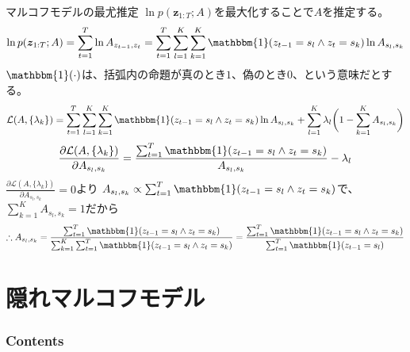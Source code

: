 \documentclass[aspectratio=169,unicode,dvipdfmx,14pt]{beamer}
\begin{document}
\begin{frame}{マルコフモデルの最尤推定}
\FontMath
$\ln p(\bm{z}_{1:T};A)$を最大化することで$A$を推定する。
\begin{align}
\ln p(\bm{z}_{1:T};A) 
= \sum_{t=1}^T \ln A_{z_{t-1}, z_t}
= \sum_{t=1}^T \sum_{l=1}^K \sum_{k=1}^K \mathbbm{1}(z_{t-1}=s_l \wedge z_t=s_k) \ln A_{s_l,s_k}
\end{align}
$\mathbbm{1}(\cdot)$は、括弧内の命題が真のとき$1$、偽のとき$0$、という意味だとする。
\vspace{-0.05in}
\begin{align}
\mathcal{L}(A,\{ \lambda_k \}) = 
\sum_{t=1}^T \sum_{l=1}^K \sum_{k=1}^K \mathbbm{1}(z_{t-1}=s_l \wedge z_t=s_k) \ln A_{s_l,s_k}
+ \sum_{l=1}^K \lambda_l \bigg( 1 - \sum_{k=1}^K A_{s_l,s_k} \bigg) 
\end{align}
\vspace{-0.1in}
\begin{align}
\frac{\partial \mathcal{L}(A,\{ \lambda_k \})}{\partial A_{s_l,s_k}}
= \frac{ \sum_{t=1}^T \mathbbm{1}(z_{t-1}=s_l \wedge z_t=s_k) }{ A_{s_l,s_k} } - \lambda_l
\end{align}
$\frac{\partial \mathcal{L}(A,\{ \lambda_k \})}{\partial A_{s_l,s_k}} = 0$より
$A_{s_l,s_k} \propto \sum_{t=1}^T \mathbbm{1}(z_{t-1}=s_l \wedge z_t=s_k)$で、
$\sum_{k=1}^K A_{s_l,s_k}=1$だから
\begin{align}
\therefore A_{s_l,s_k} = \frac{ \sum_{t=1}^T \mathbbm{1}(z_{t-1}=s_l \wedge z_t=s_k) }
{ \sum_{k=1}^K \sum_{t=1}^T \mathbbm{1}(z_{t-1}=s_l \wedge z_t=s_k) }
= \frac{ \sum_{t=1}^T \mathbbm{1}(z_{t-1}=s_l \wedge z_t=s_k) }
{ \sum_{t=1}^T \mathbbm{1}(z_{t-1}=s_l) }
\end{align}
\end{frame}

\section{隠れマルコフモデル}

\begin{frame}\frametitle{Contents}
\Large \tableofcontents[currentsection]
\end{frame}
\end{document}
